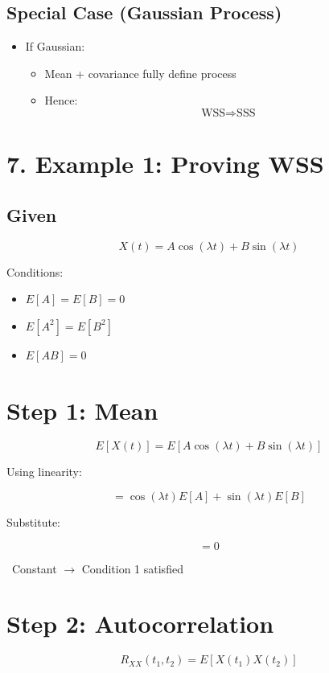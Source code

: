 \documentclass[12pt]{article}
\begin{document}
\subsection*{Special Case (Gaussian Process)}

\begin{itemize}
\item If Gaussian:
\begin{itemize}
\item Mean + covariance fully define process
\item Hence:
\[
\text{WSS} \Rightarrow \text{SSS}
\]
\end{itemize}
\end{itemize}

\section*{7. Example 1: Proving WSS}

\subsection*{Given}

\[
X(t) = A\cos(\lambda t) + B\sin(\lambda t)
\]

Conditions:

\begin{itemize}
\item $E[A]=E[B]=0$
\item $E[A^2]=E[B^2]$
\item $E[AB]=0$
\end{itemize}

\section*{Step 1: Mean}

\[
E[X(t)] = E[A\cos(\lambda t) + B\sin(\lambda t)]
\]

Using linearity:

\[
= \cos(\lambda t)E[A] + \sin(\lambda t)E[B]
\]

Substitute:

\[
= 0
\]

\checkmark\ Constant $\rightarrow$ Condition 1 satisfied

\section*{Step 2: Autocorrelation}

\[
R_{XX}(t_1, t_2) = E[X(t_1)X(t_2)]
\]
\end{document}
